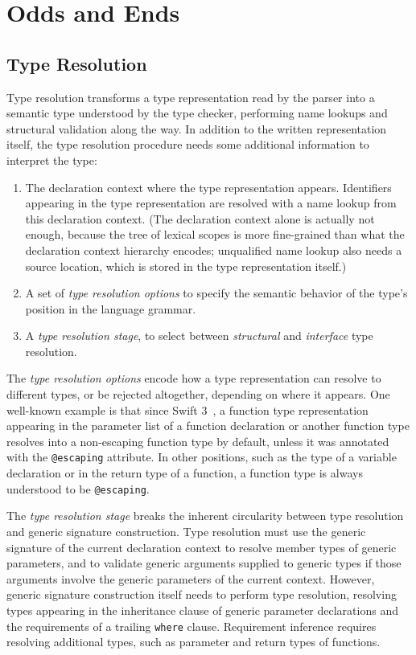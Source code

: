 \documentclass[a4paper,headsepline,bibliography=totoc,toc=flat,fleqn,twoside=semi]{scrbook}
\theoremstyle{definition}
\theoremstyle{definition}
\theoremstyle{definition}
\newcommand{\ifWIP}{\iffalse}
\begin{document}
\part{Odds and Ends}\label{part odds and ends}

\chapter{Type Resolution}\label{typeresolution}

\ifWIP
Type resolution transforms a type representation read by the parser into a semantic type understood by the type checker, performing name lookups and structural validation along the way. In addition to the written representation itself, the type resolution procedure needs some additional information to interpret the type:
\begin{enumerate}
\item The declaration context where the type representation appears. Identifiers appearing in the type representation are resolved with a name lookup from this declaration context. (The declaration context alone is actually not enough, because the tree of lexical scopes is more fine-grained than what the declaration context hierarchy encodes; unqualified name lookup also needs a source location, which is stored in the type representation itself.)
\item A set of \emph{type resolution options} to specify the semantic behavior of the type's position in the language grammar.
\item A \emph{type resolution stage}, to select between \emph{structural} and \emph{interface} type resolution.
\end{enumerate}

The \emph{type resolution options} encode how a type representation can resolve to different types, or be rejected altogether, depending on where it appears. One well-known example is that since Swift 3~\cite{se0103}, a function type representation appearing in the parameter list of a function declaration or another function type resolves into a non-escaping function type by default, unless it was annotated with the \texttt{@escaping} attribute. In other positions, such as the type of a variable declaration or in the return type of a function, a function type is always understood to be \texttt{@escaping}.

The \emph{type resolution stage} breaks the inherent circularity between type resolution and generic signature construction. Type resolution must use the generic signature of the current declaration context to resolve member types of generic parameters, and to validate generic arguments supplied to generic types if those arguments involve the generic parameters of the current context. However, generic signature construction itself needs to perform type resolution, resolving types appearing in the inheritance clause of generic parameter declarations and the requirements of a trailing \texttt{where} clause. Requirement inference requires resolving additional types, such as parameter and return types of functions.
\end{document}
